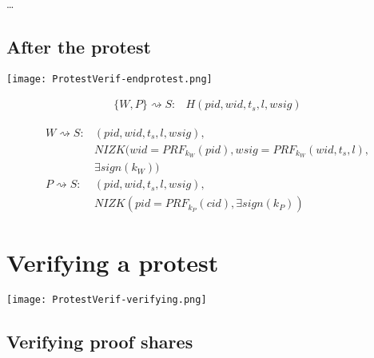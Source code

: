 \begin{frame}
  \dots
\end{frame}

\subsection{After the protest}

\begin{frame}
  \centering
  \texttt{[image: ProtestVerif-endprotest.png]}
\end{frame}

\begin{frame}
  \begin{minipage}{\linewidth}
    \begin{align*}
      \{W, P\}\rightsquigarrow S\colon & H(pid, wid, t_s, l, wsig)
    \end{align*}
  \end{minipage}
\end{frame}

\begin{frame}
  \begin{minipage}{\linewidth}
    \begin{align*}
      W\rightsquigarrow S\colon & (pid, wid, t_s, l, wsig),\\
        & NIZK(wid = PRF_{k_W}(pid), wsig = PRF_{k_W}(wid, t_s, l),\\
        & \exists sign(k_W)) \\
        P\rightsquigarrow S\colon & (pid, wid, t_s, l, wsig),\\
        & NIZK(pid = PRF_{k_P}(cid), \exists sign(k_P))
    \end{align*}
  \end{minipage}
\end{frame}


\section[Verifying]{Verifying a protest}

\begin{frame}
  \centering
  \texttt{[image: ProtestVerif-verifying.png]}
\end{frame}

\subsection{Verifying proof shares}

